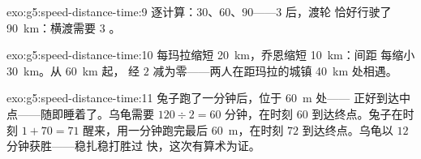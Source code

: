 \begin{solution}{exo:g5:speed-distance-time:9}
逐计算：$30$、$60$、$90$——$3$ 后，渡轮
恰好行驶了 \qty{90}{km}：横渡需要 $3$ 。
\end{solution}

\begin{solution}{exo:g5:speed-distance-time:10}
每玛拉缩短 \qty{20}{km}，乔恩缩短 \qty{10}{km}：间距
每缩小 \qty{30}{km}。从 \qty{60}{km} 起，
经 $2$ 减为零——两人在距玛拉的城镇 \qty{40}{km} 处相遇。
\end{solution}

\begin{solution}{exo:g5:speed-distance-time:11}
兔子跑了一分钟后，位于 \qty{60}{m} 处——
正好到达中点——随即睡着了。乌龟需要 $120 \div 2 = 60$
分钟，在时刻 $60$ 到达终点。兔子在时刻 $1 + 70 =
71$ 醒来，用一分钟跑完最后 \qty{60}{m}，在时刻
$72$ 到达终点。乌龟以 $12$ 分钟获胜——稳扎稳打胜过
快，这次有算术为证。
\end{solution}
